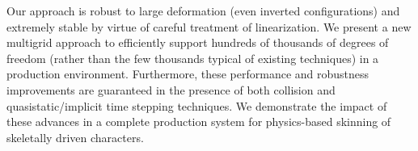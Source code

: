 
\cite{irving:2004:invertible}\cite{Zhu:2010:EMM}\cite{teran:2005:quasistatics} Our approach is robust to large deformation (even inverted configurations) and extremely stable by virtue of careful treatment of linearization. We present a new multigrid approach to efficiently support hundreds of thousands of degrees of freedom (rather than the few thousands typical of existing techniques) in a production environment. Furthermore, these performance and robustness improvements are guaranteed in the presence of both collision and quasistatic/implicit time stepping techniques.  We demonstrate the impact of these advances in a complete production system for physics-based skinning of skeletally driven characters. 


